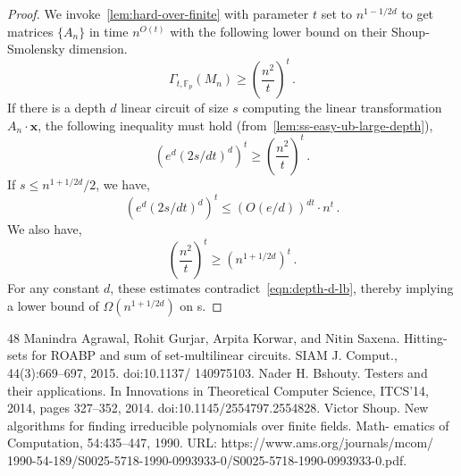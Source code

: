 \documentclass[10pt,a4paper]{article}
\newcommand{\F}{\mathbb F}
\newcommand{\vecx}{\mathbf x}
\newcommand{\inparen}[1]{\left(#1\right)}
\begin{document}
\begin{proof}
We invoke~\autoref{lem:hard-over-finite} with parameter $t$ set to  $n^{1-1/2d}$ to get matrices $\{A_n\}$ in time $n^{O(t)}$ with the following lower bound on their Shoup-Smolensky dimension. 
\[
\Gamma_{t, \F_p}(M_{n}) \geq \left(\frac{n^2}{t}\right)^t\, .
\] 
If there is a  depth $d$ linear circuit of size $s$ computing the linear transformation $A_n\cdot \vecx$, the following inequality must hold (from~\autoref{lem:ss-easy-ub-large-depth}),
\begin{equation}\label{eqn:depth-d-lb}
\inparen{e^d (2s/dt)^d}^t \geq \left(\frac{n^2}{t}\right)^t \, .
\end{equation}
If $s \leq   n^{1+1/2d}/2$, we have, 
\[
\inparen{e^d (2s/dt)^d}^t \leq (O(e/d))^{dt} \cdot n^t\, . 
\]
We also have, 
\[
\left(\frac{n^2}{t}\right)^t \geq \left(n^{1 + 1/2d} \right)^t \, .
\]
For any constant $d$, these estimates contradict~\autoref{eqn:depth-d-lb}, thereby implying a lower bound of $\Omega(n^{1+1/2d})$ on s. 
\end{proof}


\begin{thebibliography}{48}
 Manindra Agrawal, Rohit Gurjar, Arpita Korwar, and Nitin Saxena. Hitting-sets for ROABP and sum of set-multilinear circuits. SIAM J. Comput., 44(3):669–697, 2015. doi:10.1137/ 140975103.
 Nader H. Bshouty. Testers and their applications. In Innovations in Theoretical Computer Science, ITCS’14, 2014, pages 327–352, 2014. doi:10.1145/2554797.2554828.
 Victor Shoup. New algorithms for finding irreducible polynomials over finite fields. Math- ematics of Computation, 54:435–447, 1990. URL: https://www.ams.org/journals/mcom/ 1990-54-189/S0025-5718-1990-0993933-0/S0025-5718-1990-0993933-0.pdf.
\end{thebibliography}
\end{document}
